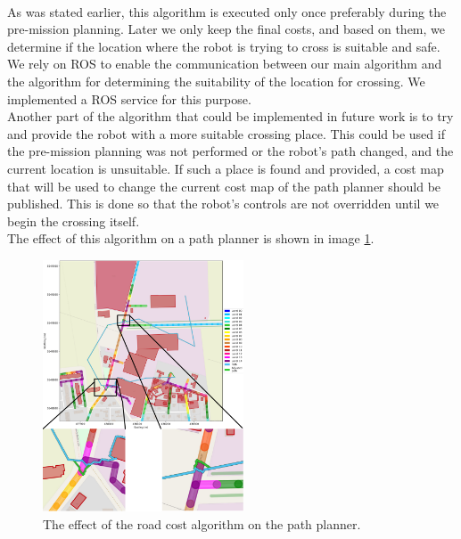         \\
            As was stated earlier, this algorithm is executed only once preferably during the pre-mission planning. Later we only keep the final costs, and based on them, we determine if the location where the robot is trying to cross is suitable and safe.\\
            We rely on ROS to enable the communication between our main algorithm and the algorithm for determining the suitability of the location for crossing. We implemented a ROS service for this purpose.\\
            Another part of the algorithm that could be implemented in future work is to try and provide the robot with a more suitable crossing place. This could be used if the pre-mission planning was not performed or the robot's path changed, and the current location is unsuitable. If such a place is found and provided, a cost map that will be used to change the current cost map of the path planner should be published. This is done so that the robot's controls are not overridden until we begin the crossing itself.\\
            The effect of this algorithm on a path planner is shown in image \ref{fig:path}.
            \begin{figure}[ht]
                \centering
                \includegraphics[width=0.53\textwidth]{images/path.png}
                \caption{The effect of the road cost algorithm on the path planner.}
                \label{fig:path}
            \end{figure}

